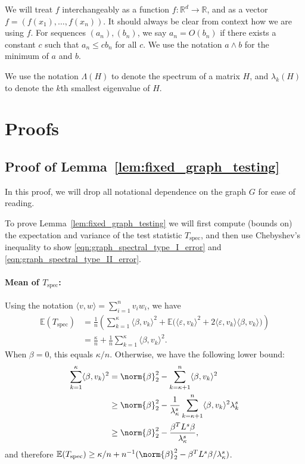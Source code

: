 \documentclass{article}
\newcommand{\Reals}{\mathbb{R}}
\newcommand{\1}{\mathbf{1}}
\newcommand{\Rd}{\Reals^d}
\newcommand{\Ebb}{\mathbb{E}}
\newcommand{\dotp}[2]{\langle #1, #2 \rangle}
\newcommand{\spec}{\mathrm{spec}}
\theoremstyle{alden}
\theoremstyle{aldenthm}
\theoremstyle{definition}
\theoremstyle{remark}
\begin{document}
We will treat $f$ interchangeably as a function $f:\Rd \to \Reals$, and as a vector $f = (f(x_1),\ldots,f(x_n))$. It should always be clear from context how we are using $f$.
For sequences $(a_n), (b_n)$, we say $a_n = O(b_n)$ if there exists a constant $c$ such that $a_n \leq cb_n$ for all $c$. We use the notation $a \wedge b$ for the minimum of $a$ and $b$.

We use the notation $\Lambda(H)$ to denote the spectrum of a matrix $H$, and $\lambda_k(H)$ to denote the $k$th smallest eigenvalue of $H$.

\section{Proofs}

\subsection{Proof of Lemma~\ref{lem:fixed_graph_testing}}

In this proof, we will drop all notational dependence on the graph $G$ for ease of reading. 

To prove Lemma~\ref{lem:fixed_graph_testing} we will first compute (bounds on) the expectation and variance of the test statistic $T_{\mathrm{spec}}$, and then use Chebyshev's inequality to show \eqref{eqn:graph_spectral_type_I_error} and \eqref{eqn:graph_spectral_type_II_error}.

\paragraph{Mean of $T_{\mathrm{spec}}$:} Using the notation $\dotp{v}{w} = \sum_{i = 1}^{n} v_iw_i$, we have
\begin{align*}
\Ebb(T_{\spec}) & = \frac{1}{n}\left(\sum_{k = 1}^{\kappa} \dotp{\beta}{v_k}^2 + \Ebb\bigl( \dotp{\varepsilon}{v_k}^2 + 2 \dotp{\varepsilon}{v_k} \dotp{\beta}{v_k}\bigr)\right) \\
& = \frac{\kappa}{n} + \frac{1}{n}\sum_{k = 1}^{\kappa}\dotp{\beta}{v_k}^2.
\end{align*}
When $\beta = 0$, this equals $\kappa/n$. Otherwise, we have the following lower bound:
\begin{align*}
\sum_{k = 1}^{\kappa}\dotp{\beta}{v_k}^2 & = \norm{\beta}_2^2 - \sum_{k = \kappa + 1}^{n} \dotp{\beta}{v_k}^2 \\
& \geq \norm{\beta}_2^2 - \frac{1}{\lambda_{\kappa}^s}\sum_{k = \kappa + 1}^{n} \dotp{\beta}{v_k}^2 \lambda_k^s \\
& \geq \norm{\beta}_2^2 - \frac{\beta^T L^s \beta}{\lambda_{\kappa}^s},
\end{align*}
and therefore $\Ebb(T_{\spec}) \geq \kappa/n + n^{-1}(\norm{\beta}_2^2 - \beta^T L^s \beta/\lambda_{\kappa}^s)$. 
\end{document}
